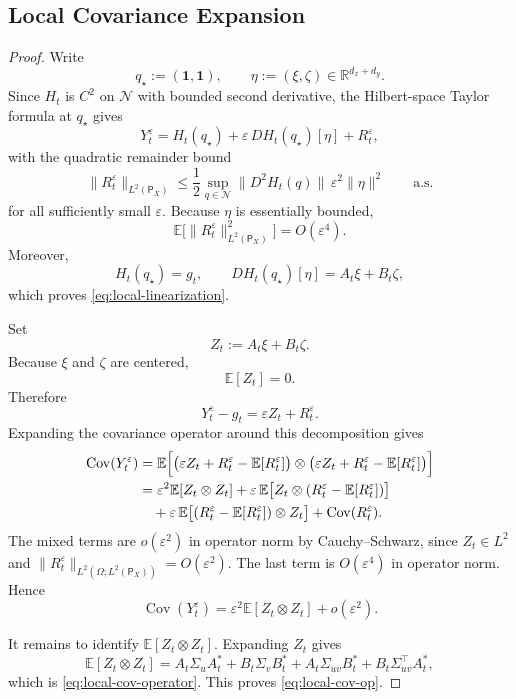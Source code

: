 \documentclass[11pt]{article}
\theoremstyle{definition}
\newcommand{\R}{\mathbb{R}}
\newcommand{\E}{\mathbb{E}}
\begin{document}
\subsection{Local Covariance Expansion}

\begin{proof}
Write
\[
  q_\star:=(\mathbf 1,\mathbf 1),
  \qquad
  \eta:=(\xi,\zeta)\in\R^{d_x+d_y}.
\]
Since $H_t$ is $C^2$ on $\mathcal N$ with bounded second derivative, the
Hilbert-space Taylor formula at $q_\star$ gives
\[
  Y_t^\varepsilon
  =
  H_t(q_\star)
  +
  \varepsilon\,D H_t(q_\star)[\eta]
  +
  R_t^\varepsilon,
\]
with the quadratic remainder bound
\[
  \|R_t^\varepsilon\|_{L^2(\mathsf P_X)}
  \le
  \frac12
  \sup_{q\in\mathcal N}\|D^2 H_t(q)\|\,
  \varepsilon^2\|\eta\|^2
  \qquad
  \text{a.s.}
\]
for all sufficiently small $\varepsilon$. Because $\eta$ is essentially bounded,
\[
  \E\bigl[\|R_t^\varepsilon\|_{L^2(\mathsf P_X)}^2\bigr]
  =
  O(\varepsilon^4).
\]
Moreover,
\[
  H_t(q_\star)=g_t,
  \qquad
  D H_t(q_\star)[\eta]=A_t\xi+B_t\zeta,
\]
which proves \eqref{eq:local-linearization}.

Set
\[
  Z_t:=A_t\xi+B_t\zeta.
\]
Because $\xi$ and $\zeta$ are centered,
\[
  \E[Z_t]=0.
\]
Therefore
\[
  Y_t^\varepsilon-g_t=\varepsilon Z_t+R_t^\varepsilon.
\]
Expanding the covariance operator around this decomposition gives
\begin{align*}
  \operatorname{Cov}(Y_t^\varepsilon)
  &=
  \E\Bigl[
    \bigl(\varepsilon Z_t+R_t^\varepsilon-\E[R_t^\varepsilon]\bigr)
    \otimes
    \bigl(\varepsilon Z_t+R_t^\varepsilon-\E[R_t^\varepsilon]\bigr)
  \Bigr]\\
  &=
  \varepsilon^2\E[Z_t\otimes Z_t]
  +
  \varepsilon\,\E\bigl[Z_t\otimes(R_t^\varepsilon-\E[R_t^\varepsilon])\bigr]\\
  &\quad+
  \varepsilon\,\E\bigl[(R_t^\varepsilon-\E[R_t^\varepsilon])\otimes Z_t\bigr]
  +
  \operatorname{Cov}(R_t^\varepsilon).
\end{align*}
The mixed terms are $o(\varepsilon^2)$ in operator norm by Cauchy--Schwarz,
since $Z_t\in L^2$ and
\(
  \|R_t^\varepsilon\|_{L^2(\Omega;L^2(\mathsf P_X))}
  =
  O(\varepsilon^2)
\).
The last term is $O(\varepsilon^4)$ in operator norm. Hence
\[
  \operatorname{Cov}(Y_t^\varepsilon)
  =
  \varepsilon^2\E[Z_t\otimes Z_t]
  +o(\varepsilon^2).
\]

It remains to identify $\E[Z_t\otimes Z_t]$. Expanding $Z_t$ gives
\[
  \E[Z_t\otimes Z_t]
  =
  A_t\Sigma_u A_t^*
  +
  B_t\Sigma_v B_t^*
  +
  A_t\Sigma_{uv} B_t^*
  +
  B_t\Sigma_{uv}^\top A_t^*,
\]
which is \eqref{eq:local-cov-operator}. This proves
\eqref{eq:local-cov-op}.


\end{proof}
\end{document}
